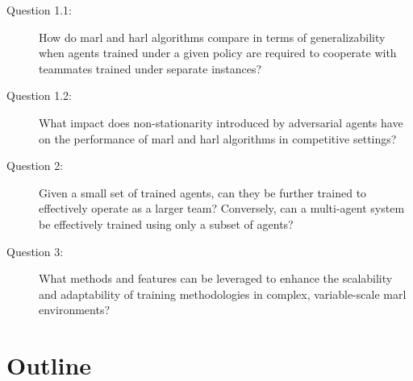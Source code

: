 \begin{description}
    \item[Question 1.1:] 
    How do \gls{marl} and \gls{harl} algorithms compare in terms of 
    generalizability when agents trained under a given policy are required to 
    cooperate with teammates trained under separate instances?
    \item[Question 1.2:] 
    What impact does non-stationarity introduced by adversarial agents have 
    on the performance of \gls{marl} and \gls{harl} algorithms in competitive 
    settings?
    \item[Question 2:] 
    Given a small set of trained agents, can they be further trained 
    to effectively operate as a larger team? Conversely, can a 
    multi-agent system be effectively trained using only a subset of agents?
    \item[Question 3:] 
    What methods and features can be leveraged to enhance the 
    scalability and adaptability of training methodologies in complex, 
    variable-scale \gls{marl} environments?
\end{description}

\section{Outline}%

\begin{comment} %
The remainder of this document is designed to systematically explore 
the complex field of multi-agent reinforcement learning, 
particularly focusing on heterogeneous-agent systems.
Following this introductory chapter, 
\ref{ch:literature_review}: Literature Review provides a comprehensive analysis 
of the seminal and recent literature pertinent to our research focus. 
\Cref{ch:methodology} details the experimental and analytical techniques 
employed. \Cref{ch:results} presents the data and findings from our research, 
followed by \cref{ch:discussion}, where these results are interpreted 
in the context of existing knowledge and their implications for future 
research are explored.
The \emph{dissertation} will conclude with~\cref{ch:conclusion}, 
which summarizes the research and suggests avenues for further investigation. 
Each chapter builds upon the previous to provide a comprehensive understanding 
of the topic, aiming to contribute valuable insights to the field of \gls{harl}.
\end{comment}

